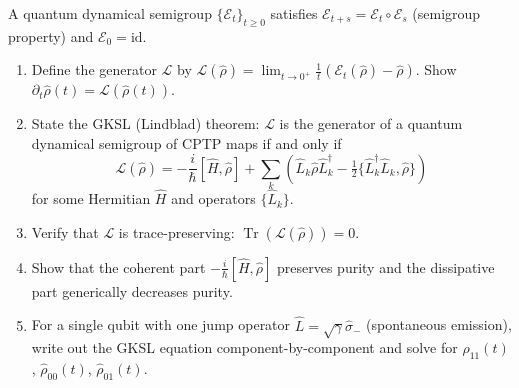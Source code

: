 \documentclass[11pt,a4paper]{article}
\begin{document}
\bigskip

\begin{tcolorbox}[gradprobbox, title={Problem 4 --- GKSL Master Equation: Derivation Outline (T5)}]
A quantum dynamical semigroup $\{\mathcal{E}_t\}_{t\ge 0}$ satisfies
$\mathcal{E}_{t+s}=\mathcal{E}_t\circ\mathcal{E}_s$ (semigroup property)
and $\mathcal{E}_0=\mathrm{id}$.

\begin{enumerate}[label=(\alph*), itemsep=8pt]
  \item Define the generator $\mathcal{L}$ by
        $\mathcal{L}(\hat{\rho})=\lim_{t\to 0^+}\tfrac{1}{t}(\mathcal{E}_t(\hat{\rho})-\hat{\rho})$.
        Show $\partial_t\hat{\rho}(t)=\mathcal{L}(\hat{\rho}(t))$.
  \item State the GKSL (Lindblad) theorem: $\mathcal{L}$ is the generator
        of a quantum dynamical semigroup of CPTP maps if and only if
        \[
          \mathcal{L}(\hat{\rho})=-\frac{i}{\hbar}[\hat{H},\hat{\rho}]
          +\sum_k\!\left(\hat{L}_k\hat{\rho}\hat{L}_k^\dagger
          -\tfrac{1}{2}\{\hat{L}_k^\dagger\hat{L}_k,\hat{\rho}\}\right)
        \]
        for some Hermitian $\hat{H}$ and operators $\{\hat{L}_k\}$.
  \item Verify that $\mathcal{L}$ is trace-preserving: $\operatorname{Tr}(\mathcal{L}(\hat{\rho}))=0$.
  \item Show that the coherent part $-\tfrac{i}{\hbar}[\hat{H},\hat{\rho}]$
        preserves purity and the dissipative part generically decreases purity.
  \item For a single qubit with one jump operator $\hat{L}=\sqrt{\gamma}\hat{\sigma}_-$
        (spontaneous emission), write out the GKSL equation component-by-component
        and solve for $\hat{\rho}_{11}(t)$, $\hat{\rho}_{00}(t)$, $\hat{\rho}_{01}(t)$.
\end{enumerate}
\end{tcolorbox}

\bigskip
\end{document}
